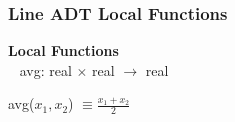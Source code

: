 \documentclass[t,12pt,numbers,fleqn]{beamer}
\begin{document}

\begin{frame}
\frametitle{Line ADT Local Functions}

\textbf{Local Functions}\\
~\newline
avg: real $\times$ real $\rightarrow$ real

\noindent avg($x_1, x_2$) $\equiv \frac{x_1 + x_2}{2}$

\end{frame}




\end{document}
